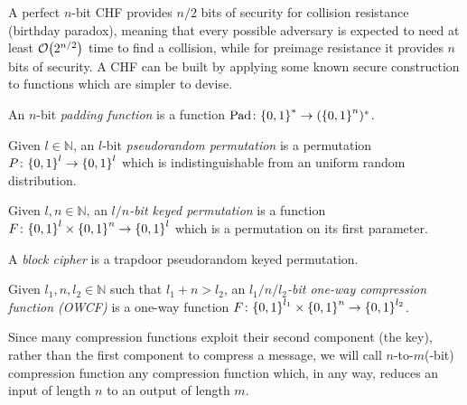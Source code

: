 A perfect \(n\)-bit CHF provides \(n/2\) bits of security for collision resistance 
(birthday paradox), meaning that every possible adversary is expected to need at least 
\(\BigO{2^{n/2}}\) time to find a collision, 
while for preimage resistance it provides \(n\) bits of security.
A CHF can be built by applying some known secure construction to functions which are
simpler to devise.
\begin{definition}
	An \(n\)-bit \emph{padding function} is a function 
	\(\Pad\colon \Set{0, 1}^{*} \to \Parens{\Set{0, 1}^n}^{*}\).
\end{definition}
\begin{definition}
	Given \(l \in \mathbb{N}\), an \(l\)-bit \emph{pseudorandom permutation} is a permutation 
	\(P\colon \Set{0, 1}^l \to \Set{0, 1}^l\) which is indistinguishable from an uniform random 
	distribution.
\end{definition}
\begin{definition}
	Given \(l, n \in \mathbb{N}\), an \emph{\(l/n\)-bit keyed permutation} is
	a function \(F\colon \Set{0, 1}^l \times \Set{0, 1}^n \to \Set{0, 1}^l\) which is a permutation 
  on its first parameter.
\end{definition}
\begin{definition}
  A \emph{block cipher} is a trapdoor pseudorandom keyed permutation.
\end{definition}
\begin{definition}
	Given \(l_1, n, l_2 \in \mathbb{N}\) such that \(l_1 + n > l_2\), an 
	\emph{\(l_1/n/l_2\)-bit one-way compression function (OWCF)} is a one-way function 
	\(F\colon \Set{0, 1}^{l_1} \times \Set{0, 1}^{n} \to \Set{0, 1}^{l_2}\).
\end{definition}
Since many compression functions exploit their second component (the key), rather than
the first component to compress a message, we will call \(n\)-to-\(m\)(-bit) compression function 
any compression function which, in any way, reduces an input of length \(n\) to an output of 
length \(m\).

